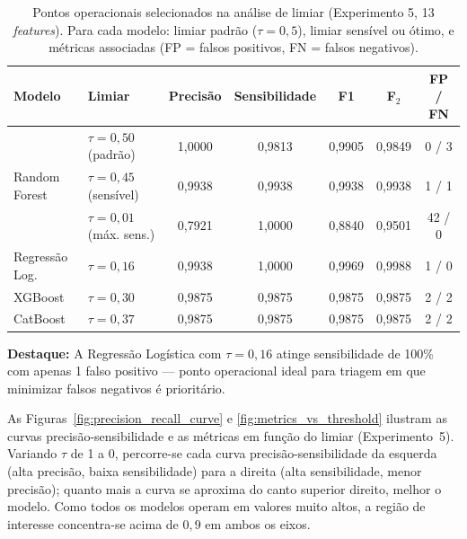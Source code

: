 \documentclass[msc]{on} %
\providecommand{\DIFaddtex}[1]{{\protect\color{red}#1}} %
\providecommand{\DIFaddbegin}{} %
\providecommand{\DIFaddend}{} %
\providecommand{\DIFadd}[1]{\texorpdfstring{\DIFaddtex{#1}}{#1}} %
\begin{document}
\begin{table}[htbp]
\centering
\caption{Pontos operacionais selecionados na análise de limiar (Experimento 5, 13 \textit{features}). Para cada modelo: limiar padrão ($\tau = 0{,}5$), limiar sensível ou ótimo, e métricas associadas (FP = falsos positivos, FN = falsos negativos).}
\label{tab:threshold_comparacao}
\footnotesize
\begin{tabular}{llccccc}
\hline
\textbf{Modelo} & \textbf{Limiar} & \textbf{Precisão} & \textbf{Sensibilidade} & \textbf{F1} & \textbf{F$_2$} & \textbf{FP / FN} \\
\hline
\multirow{3}{*}{Random Forest}
& $\tau = 0{,}50$ (padrão) & 1,0000 & 0,9813 & 0,9905 & 0,9849 & 0 / 3 \\
& $\tau = 0{,}45$ (sensível) & 0,9938 & 0,9938 & 0,9938 & 0,9938 & 1 / 1 \\
& $\tau = 0{,}01$ (máx. sens.) & 0,7921 & 1,0000 & 0,8840 & 0,9501 & 42 / 0 \\
\hline
Regressão Log. & $\tau = 0{,}16$ & 0,9938 & 1,0000 & 0,9969 & 0,9988 & 1 / 0 \\
\hline
XGBoost & $\tau = 0{,}30$ & 0,9875 & 0,9875 & 0,9875 & 0,9875 & 2 / 2 \\
\hline
CatBoost & $\tau = 0{,}37$ & 0,9875 & 0,9875 & 0,9875 & 0,9875 & 2 / 2 \\
\hline
\end{tabular}
\end{table}

\textbf{Destaque:} A Regressão Logística com $\tau = 0{,}16$ atinge sensibilidade de 100\% com apenas 1 falso positivo --- ponto operacional ideal para triagem em que minimizar falsos negativos é prioritário.

As Figuras~\ref{fig:precision_recall_curve} e \ref{fig:metrics_vs_threshold} ilustram as curvas precisão-sensibilidade e as métricas em função do limiar (Experimento~5). \DIFaddbegin \DIFadd{Variando $\tau$ de 1 a 0, percorre-se cada curva precisão-sensibilidade da esquerda (alta precisão, baixa sensibilidade) para a direita (alta sensibilidade, menor precisão); quanto mais a curva se aproxima do canto superior direito, melhor o modelo. Como todos os modelos operam em valores muito altos, a região de interesse concentra-se acima de $0{,}9$ em ambos os eixos.
}\DIFaddend 
\end{document}
